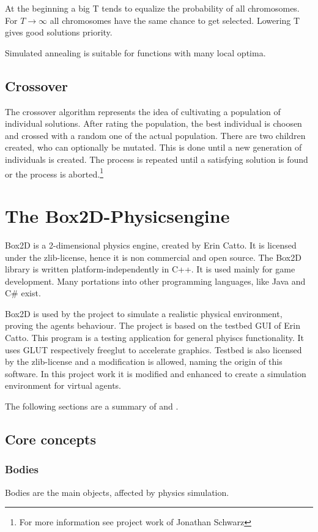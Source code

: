 \documentclass[10pt,a4paper,DIV=11]{scrreprt}
\begin{document}
At the beginning a big T tends to equalize the probability of all chromosomes. For $T \to \infty$ all chromosomes have the same chance to get selected. Lowering T gives good solutions priority.

Simulated annealing is suitable for functions with many local optima.

\section{Crossover}
The crossover algorithm represents the idea of cultivating a population of individual solutions. After rating the population, the best individual is choosen and crossed with a random one of the actual population. There are two children created, who can optionally be mutated. This is done until a new generation of individuals is created.
The process is repeated until a satisfying solution is found or the process is aborted.\footnote{For more information see project work of Jonathan Schwarz}



\chapter{The Box2D-Physicsengine}
Box2D is a 2-dimensional physics engine, created by Erin Catto\cite{box}. It is licensed under the zlib-license, hence it is non commercial and open source. The Box2D library is written platform-independently in C++. It is used mainly for game development. Many portations into other programming languages, like Java and C\# exist.

Box2D is used by the project to simulate a realistic physical environment, proving the agents behaviour. The project is based on the testbed GUI of Erin Catto. This program is a testing application for general phyiscs functionality. It uses GLUT respectively freeglut to accelerate graphics. Testbed is also licensed by the zlib-license and a modification is allowed, naming the origin of this software. In this project work it is modified and enhanced to create a simulation environment for virtual agents.

The following sections are a summary of \cite{box} and \cite{iforce}.

\section{Core concepts}

\subsection{Bodies}
Bodies are the main objects, affected by physics simulation.
\end{document}
